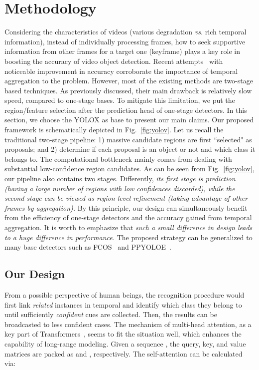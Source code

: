 \documentclass[letterpaper]{article} \usepackage{aaai23}  \usepackage{times}  \usepackage{helvet}  \usepackage{courier}  \usepackage[hyphens]{url}  \usepackage{graphicx} \urlstyle{rm} \def\UrlFont{\rm}  \usepackage{natbib}  \usepackage{caption} \usepackage{xcolor}
\begin{document}
\section{Methodology}

Considering the characteristics of videos (various degradation \emph{vs.} rich temporal information), instead of individually processing frames, how to seek supportive information from other frames for a target one (keyframe) plays a key role in boosting the accuracy of video object detection. Recent attempts~\cite{deng2019relation,chen2020memory,wu2019sequence,he2022queryprop} with noticeable improvement in accuracy corroborate the importance of temporal aggregation to the problem. However, most of the existing methods are two-stage based techniques. As previously discussed, their main drawback is relatively slow speed, compared to one-stage bases. To mitigate this limitation, we put the region/feature selection after the prediction head of one-stage detectors. In this section, we choose the YOLOX as base to present our main claims. Our proposed framework is schematically depicted in Fig.~\ref{fig:yolov}. Let us recall the traditional two-stage pipeline: 1) massive candidate regions are first ``selected" as proposals; and 2) determine if each proposal is an object or not and which class it belongs to. The computational bottleneck mainly comes from dealing with substantial low-confidence region candidates. As can be seen from Fig.~\ref{fig:yolov}, our pipeline also contains two stages. Differently, \emph{its first stage is prediction (having a large number of regions with low confidences discarded), while the second stage can be viewed as region-level refinement (taking advantage of other frames by aggregation).} By this principle, our design can simultaneously benefit from the efficiency of one-stage detectors and the accuracy gained from temporal aggregation. It is worth to emphasize that \emph{such a small difference in design leads to a huge difference in performance.} The proposed strategy can be generalized to many base detectors such as FCOS~\cite{tian2019fcos} and PPYOLOE~\cite{xu2022pp}. 


\subsection{Our Design}
From a possible perspective of human beings, the recognition procedure would first link \emph{related} instances in temporal and identify which class they belong to until sufficiently \emph{confident} cues are collected. Then, the results can be broadcasted to less confident cases. The mechanism of multi-head attention, as a key part of Transformers~\cite{vaswani2017attention}, seems to fit the situation well, which enhances the capability of long-range modeling. Given a sequence , the query, key, and value matrices are packed as  and , respectively. The self-attention can be calculated via:
\end{document}
